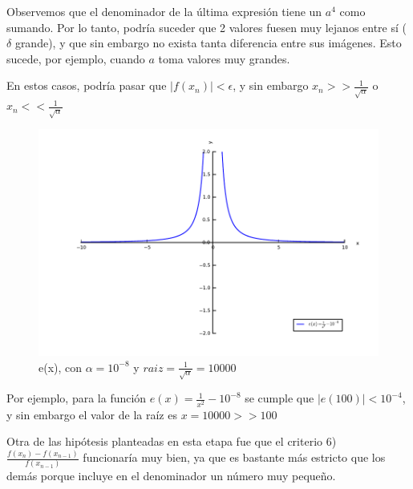 Observemos que el denominador de la última expresión tiene un $a^{4}$ como sumando. Por lo tanto, podría suceder que 2 valores fuesen muy lejanos entre sí ($\delta$ grande), y que sin embargo no exista
tanta diferencia entre sus imágenes. Esto sucede, por ejemplo, cuando $a$ toma valores muy grandes.

En estos casos, podría pasar que $|f(x_{n})| < \epsilon$, y sin embargo $x_{n} >> \frac{1}{\sqrt{\alpha}}$ o $x_{n} << \frac{1}{\sqrt{\alpha}}$

\begin{figure}[!h]
	\begin{center}
		  \includegraphics[keepaspectratio]{../Imagenes/exp3/raiz_10000.pdf}
		  \caption{e(x), con $\alpha=10^{-8}$ y $raiz=\frac{1}{\sqrt{\alpha}}=10000$ }
		  \label{fig:contra1}
	\end{center}
\end{figure}
\FloatBarrier

Por ejemplo, para la función $e(x)=\frac{1}{x^2}-10^{-8}$ se cumple que $|e(100)| < 10^{-4}$, y sin embargo el valor de la raíz es $x=10000 >> 100$

Otra de las hipótesis planteadas en esta etapa fue que el criterio 6) $\frac{f(x_{n})-f(x_{n-1})}{f(x_{n-1})}$ funcionaría muy bien, ya que es bastante más estricto que los demás porque incluye en el denominador
un número muy peque\~no.


